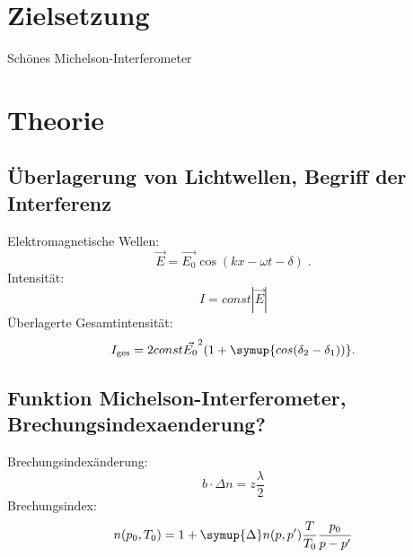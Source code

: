 \section*{Zielsetzung}
\label{sec:zielsetzung}

Schönes Michelson-Interferometer

\section{Theorie}
\label{sec:Theorie}
\subsection{Überlagerung von Lichtwellen, Begriff der Interferenz}
Elektromagnetische Wellen:
\begin{equation}
    \label{eqn:emwelle}
    \vec{E} = \vec{E_0} \cos(kx - \omega t - \delta) \; .
\end{equation}
Intensität:
\begin{equation}
    \label{eqn:Intensität}
    I = const |\vec{E}|
\end{equation}
Überlagerte Gesamtintensität:
\begin{equation}
    I_\text{ges} = 2 const \vec{E_0}^2 (1 + \symup{cos(\delta_2 - \delta_1))}.
\end{equation}

\cite{anleitung}
\subsection{Funktion Michelson-Interferometer, Brechungsindexaenderung?}
Brechungsindexänderung:
    \begin{equation}
        \label{eqn:brechungsindexunterschied}
        b \cdot \Delta n = z \frac{\lambda}{2}    
    \end{equation}
Brechungsindex:
    \begin{equation}
        \label{eqn:brechungsindex}
        n(p_0,T_0) = 1 + \symup{\Delta}n(p,p') \frac{T}{T_0} \frac{p_0}{p - p'}
    \end{equation}
        